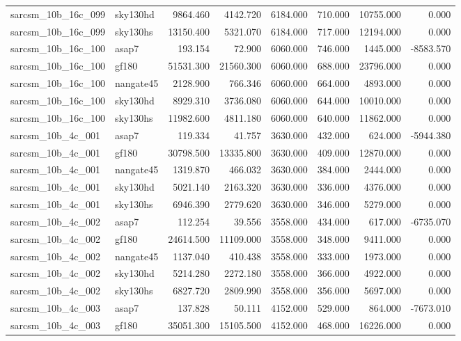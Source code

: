 \begin{tabular}{llrrrrrr}
sarcsm\_10b\_16c\_099 & sky130hd & 9864.460 & 4142.720 & 6184.000 & 710.000 & 10755.000 & 0.000 \\
sarcsm\_10b\_16c\_099 & sky130hs & 13150.400 & 5321.070 & 6184.000 & 717.000 & 12194.000 & 0.000 \\
sarcsm\_10b\_16c\_100 & asap7 & 193.154 & 72.900 & 6060.000 & 746.000 & 1445.000 & -8583.570 \\
sarcsm\_10b\_16c\_100 & gf180 & 51531.300 & 21560.300 & 6060.000 & 688.000 & 23796.000 & 0.000 \\
sarcsm\_10b\_16c\_100 & nangate45 & 2128.900 & 766.346 & 6060.000 & 664.000 & 4893.000 & 0.000 \\
sarcsm\_10b\_16c\_100 & sky130hd & 8929.310 & 3736.080 & 6060.000 & 644.000 & 10010.000 & 0.000 \\
sarcsm\_10b\_16c\_100 & sky130hs & 11982.600 & 4811.180 & 6060.000 & 640.000 & 11862.000 & 0.000 \\
sarcsm\_10b\_4c\_001 & asap7 & 119.334 & 41.757 & 3630.000 & 432.000 & 624.000 & -5944.380 \\
sarcsm\_10b\_4c\_001 & gf180 & 30798.500 & 13335.800 & 3630.000 & 409.000 & 12870.000 & 0.000 \\
sarcsm\_10b\_4c\_001 & nangate45 & 1319.870 & 466.032 & 3630.000 & 384.000 & 2444.000 & 0.000 \\
sarcsm\_10b\_4c\_001 & sky130hd & 5021.140 & 2163.320 & 3630.000 & 336.000 & 4376.000 & 0.000 \\
sarcsm\_10b\_4c\_001 & sky130hs & 6946.390 & 2779.620 & 3630.000 & 346.000 & 5279.000 & 0.000 \\
sarcsm\_10b\_4c\_002 & asap7 & 112.254 & 39.556 & 3558.000 & 434.000 & 617.000 & -6735.070 \\
sarcsm\_10b\_4c\_002 & gf180 & 24614.500 & 11109.000 & 3558.000 & 348.000 & 9411.000 & 0.000 \\
sarcsm\_10b\_4c\_002 & nangate45 & 1137.040 & 410.438 & 3558.000 & 333.000 & 1973.000 & 0.000 \\
sarcsm\_10b\_4c\_002 & sky130hd & 5214.280 & 2272.180 & 3558.000 & 366.000 & 4922.000 & 0.000 \\
sarcsm\_10b\_4c\_002 & sky130hs & 6827.720 & 2809.990 & 3558.000 & 356.000 & 5697.000 & 0.000 \\
sarcsm\_10b\_4c\_003 & asap7 & 137.828 & 50.111 & 4152.000 & 529.000 & 864.000 & -7673.010 \\
sarcsm\_10b\_4c\_003 & gf180 & 35051.300 & 15105.500 & 4152.000 & 468.000 & 16226.000 & 0.000 \\

\end{tabular}
